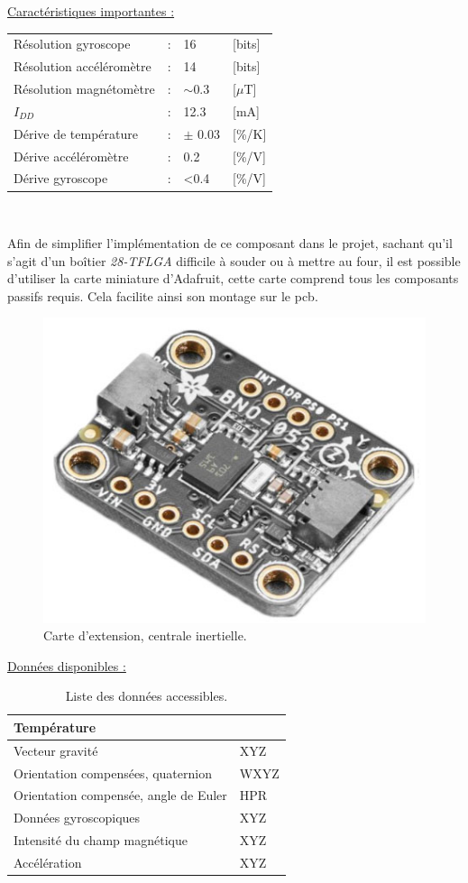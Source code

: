 \begin{center}
	\underline{Caractéristiques importantes :} \\
	\begin{tabular}{l l l l}
		Résolution gyroscope & : & 16 & [bits] \\
		Résolution accéléromètre & : & 14 & [bits] \\
		Résolution magnétomètre & : & $\sim$0.3 & [$\mu$T] \\
		$I_{DD}$ & : & 12.3 & [mA] \\
		Dérive de température & : & $\pm$ 0.03 & [\%/K] \\ 
		Dérive accéléromètre & : & 0.2 & [\%/V] \\
		Dérive gyroscope & : & <0.4 & [\%/V]
	\end{tabular} \\
\end{center}

Afin de simplifier l'implémentation de ce composant dans le projet, sachant qu'il s'agit d'un boîtier \textit{28-TFLGA} difficile à souder ou à mettre au four, il est possible d'utiliser la carte miniature d'Adafruit, cette carte comprend tous les composants passifs requis. Cela facilite ainsi son montage sur le \gls{pcb}.

\begin{figure}[h]
	\centering
	\includegraphics[width=0.4\linewidth]{../figures/pre_etude/BNO055_Adafruit}
	\caption{Carte d'extension, centrale inertielle.}
	\label{fig:bno055adafruit}
\end{figure}

\begin{center}
	\underline{Données disponibles :}
	\begin{table}[h]
		\centering
		\begin{tabular}{|ll|}
		\hline
		Température & \\
		\hline
		Vecteur gravité & XYZ \\
		\hline
		Orientation compensées, quaternion & WXYZ \\
		\hline
		Orientation compensée, angle de Euler & HPR \\
		\hline
		Données gyroscopiques & XYZ \\
		\hline
		 Intensité du champ magnétique & XYZ \\
		\hline
		Accélération & XYZ \\
		\hline
	\end{tabular}
	\caption{Liste des données accessibles.}
	\end{table}
\end{center}


